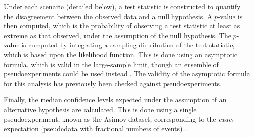 Under each scenario (detailed below), a test statistic is constructed to quantify the 
disagreement between the observed data and a null hypothesis. A $p$-value is then 
computed, which is the probability of observing a test statistic at least as extreme as that 
observed, under the assumption of the null hypothesis. The $p$-value is computed by 
integrating a sampling distribution of the test statistic, which is based upon the 
likelihood function. This is done using an asymptotic formula, which is valid in the 
large-sample limit, though an ensemble of pseudoexperiments could be used instead 
\cite{Cowan:2010}. The validity of the asymptotic formula for this analysis has previously 
been checked against pseudoexperiments.

Finally, the median confidence levels expected under the assumption of an alternative 
hypothesis are calculated. This is done using a single pseudoexperiment, known as the Asimov 
dataset, corresponding to the \textit{exact} expectation (\ie pseudodata with fractional 
numbers of events) \cite{Cowan:2010}.

